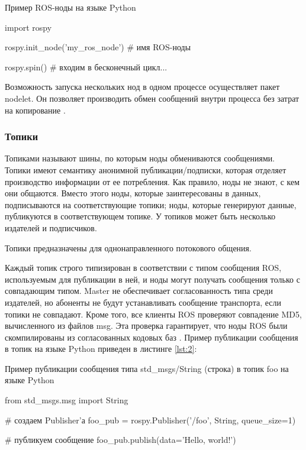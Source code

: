 \begin{Program}[H]
	\caption{Пример ROS-ноды на языке Python} \label{lst:1}
\begin{MyCode}
	import rospy
	
	rospy.init_node('my_ros_node')  # имя ROS-ноды
	
	rospy.spin()  # входим в бесконечный цикл...
\end{MyCode}
\end{Program}

Возможность запуска нескольких нод в одном процессе осуществляет пакет nodelet. Он позволяет производить обмен сообщений внутри процесса без затрат на копирование \cite{ros}.

\subsubsection{Топики}
Топиками называют шины, по которым ноды обмениваются сообщениями. Топики имеют семантику анонимной публикации/подписки, которая отделяет производство информации от ее потребления. Как правило, ноды не знают, с кем они общаются. Вместо этого ноды, которые заинтересованы в данных, подписываются на соответствующие топики; ноды, которые генерируют данные, публикуются в соответствующем топике. У топиков может быть несколько издателей и подписчиков.

Топики предназначены для однонаправленного потокового общения.

Каждый топик строго типизирован в соответствии с типом сообщения ROS, используемым для публикации в ней, и ноды могут получать сообщения только с совпадающим типом. Master не обеспечивает согласованность типа среди издателей, но абоненты не будут устанавливать сообщение транспорта, если топики не совпадают. Кроме того, все клиенты ROS проверяют совпадение MD5, вычисленного из файлов msg. Эта проверка гарантирует, что ноды ROS были скомпилированы из согласованных кодовых баз \cite{ros}. Пример публикации сообщения в топик на языке Python приведен в листинге \ref{lst:2}:

\begin{Program}[H]
	\caption{Пример публикации сообщения типа std\_msgs/String (строка) в топик foo на языке Python} \label{lst:2}
\begin{MyCode}
	from std_msgs.msg import String
	
	# создаем Publisher'а
	foo_pub = rospy.Publisher('/foo', String, queue_size=1)
	
	# публикуем сообщение
	foo_pub.publish(data='Hello, world!')
\end{MyCode}
\end{Program}

